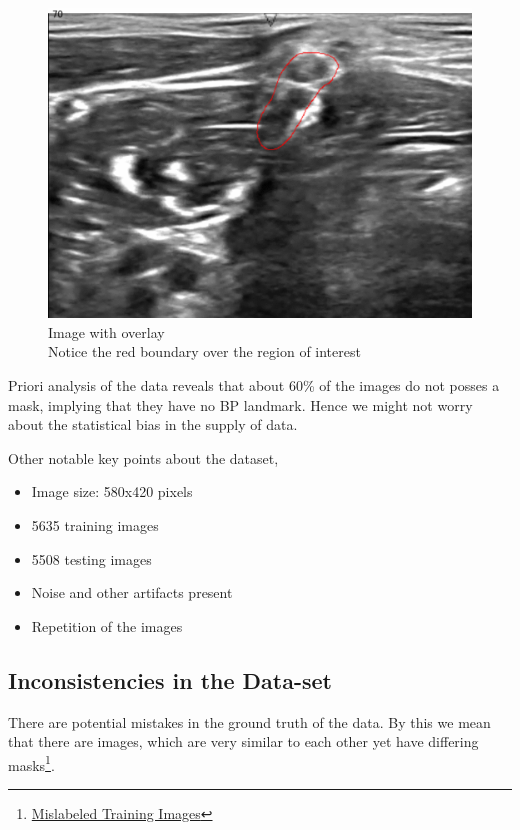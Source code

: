 \documentclass[12pt, a4paper]{article}
\begin{document}
\begin{figure}[h] 
  \includegraphics[width=\linewidth]{red_overlay.png}
  \caption{Image with overlay\\Notice the red boundary over the region of interest}
  \label{fig:overlayimage}
\end{figure}

Priori analysis of the data reveals that about 60\% of the images do not posses a mask, implying that they have no BP landmark. Hence we might not worry about the statistical bias in the supply of data. 

Other notable key points about the dataset,
\begin{itemize}
\item Image size: 580x420 pixels
\item 5635 training images
\item 5508 testing images
\item Noise and other artifacts present
\item Repetition of the images
\end{itemize}

\newpage
\subsection{Inconsistencies in the Data-set}
There are potential mistakes in the ground truth of the data. By this we mean that there are images, which are very similar to each other yet have differing masks\footnote{\href{https://www.kaggle.com/agalea91/ultrasound-nerve-segmentation/mislabeled-training-images/run/310043}{Mislabeled Training Images}}.
\end{document}
